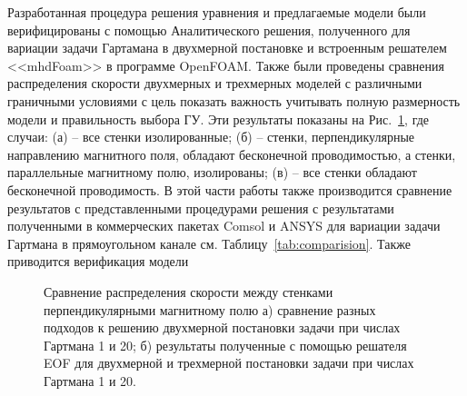 Разработанная процедура решения уравнения и предлагаемые модели были верифицированы с помощью Аналитического решения, полученного для вариации задачи Гартамана в двухмерной постановке и встроенным решателем <<mhdFoam>> в программе OpenFOAM. Также были проведены сравнения распределения скорости двухмерных и трехмерных моделей с различными граничными условиями с цель показать важность учитывать полную размерность модели и правильность выбора ГУ. Эти результаты показаны на Рис.~\ref{fig:comparision}, где случаи: (а) -- все стенки изолированные; (б) -- стенки, перпендикулярные направлению магнитного поля, обладают бесконечной проводимостью, а стенки, параллельные магнитному полю, изолированы; (в) -- все стенки обладают бесконечной проводимость. В этой части работы также производится сравнение результатов с представленными процедурами решения с результатами полученными в коммерческих пакетах Comsol и ANSYS для вариации задачи Гартмана в прямоугольном канале см. Таблицу~\ref{tab:comparision}. Также приводится верификация модели 

\begin{figure}[h]
	\caption{Сравнение распределения скорости между стенками перпендикулярными магнитному полю а) сравнение разных подходов к решению двухмерной постановки задачи при числах Гартмана 1 и 20; б) результаты полученные с помощью решателя EOF для двухмерной и трехмерной постановки задачи при числах Гартмана 1 и 20.}
	\label{fig:comparision}
	
\end{figure}

